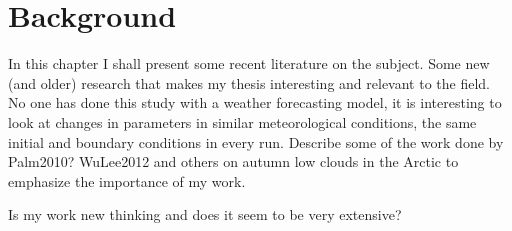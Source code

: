 \chapter{Background}
\label{chap:background}
In this chapter I shall present some recent literature on the subject. Some new (and older) research that makes my thesis interesting and relevant to the field. No one has done this study with a weather forecasting model, it is interesting to look at changes in parameters in similar meteorological conditions, the same initial and boundary conditions in every run.
Describe some of the work done by Palm2010? WuLee2012 and others on autumn low clouds in the Arctic to emphasize the importance of my work.

Is my work new thinking and does it seem to be very extensive?


